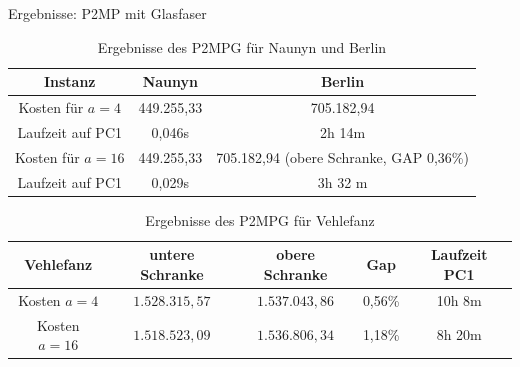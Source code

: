 \documentclass{beamer}
\begin{document}
\begin{frame}{Ergebnisse: P2MP mit Glasfaser}
\begin{table}[h]
 	\centering
 	\begin{tabular}{c|c|c}
 		Instanz & Naunyn & Berlin \\	
 		\hline
 		Kosten für $a=4$ & 449.255,33 & 705.182,94 \\
 		Laufzeit auf PC1 & 0,046s & 2h 14m \\
 		\hline
 		Kosten für $a=16$ & 449.255,33 & 705.182,94 (obere Schranke, GAP 0,36\%) \\
 		Laufzeit auf PC1 & 0,029s & 3h 32 m \\
 	\end{tabular}
 	\caption{Ergebnisse des P2MPG f\"ur Naunyn und Berlin}
 	\label{P2MPG_Tabelle_N_B}
 \end{table}
 \begin{table}[h]
 	\centering
 	\begin{tabular}{c|c|c|c|c}
 		Vehlefanz & untere Schranke & obere Schranke & Gap & Laufzeit PC1\\	
 		\hline
 		Kosten $a=4$ & \(1.528.315,57\) & \(1.537.043,86\) & 0,56\% & 10h 8m\\
 		\hline
 		Kosten $a=16$ & \(1.518.523,09\) & \(1.536.806,34\) & 1,18\% & 8h 20m \\
 	\end{tabular}
 	\caption{Ergebnisse des P2MPG f\"ur Vehlefanz}
 	\label{P2MPG_Tabelle_V}
 \end{table}
\end{frame}
\end{document}
